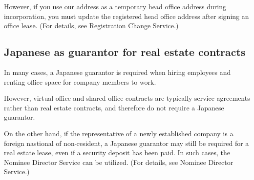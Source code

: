 However, if you use our address as a temporary head office address during incorporation, you must update the registered head office address after signing an office lease. (For details, see Registration Change Service.)

\subsection{Japanese as guarantor for real estate contracts}

In many cases, a Japanese guarantor is required when hiring employees and renting office space for company members to work.

However, virtual office and shared office contracts are typically service agreements rather than real estate contracts, and therefore do not require a Japanese guarantor.

On the other hand, if the representative of a newly established company is a foreign nastional of non-resident, a Japanese guarantor may still be required for a real estate lease, even if a security deposit has been paid. In such cases, the Nominee Director Service can be utilized. (For details, see Nominee Director Service.)




\clearpage









\section{}
\subsection{}

\begin{coloritemize}
\begin{spacing}{0.95}
  \item 
  \item 
  \item 
  \item 
\end{spacing}
\end{coloritemize}

